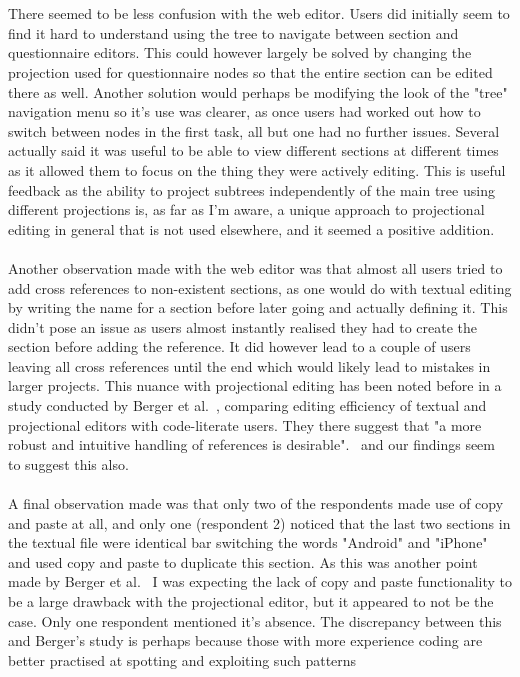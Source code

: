\documentclass{article}
\begin{document}
{\\
\\
There seemed to be less confusion with the web editor. Users did initially seem to find it hard to understand using the tree to navigate between section and questionnaire editors. This could however largely be solved by changing the projection used for questionnaire nodes so that the entire section can be edited there as well. Another solution would perhaps be modifying the look of the "tree" navigation menu so it's use was clearer, as once users had worked out how to switch between nodes in the first task, all but one had no further issues. Several actually said it was useful to be able to view different sections at different times as it allowed them to focus on the thing they were actively editing. This is useful feedback as the ability to project subtrees independently of the main tree using different projections is, as far as I'm aware, a unique approach to projectional editing in general that is not used elsewhere, and it seemed a positive addition.
\\
\\
Another observation made with the web editor was that almost all users tried to add cross references to non-existent sections, as one would do with textual editing by writing the name for a section before later going and actually defining it. This didn't pose an issue as users almost instantly realised they had to create the section before adding the reference. It did however lead to a couple of users leaving all cross references until the end which would likely lead to mistakes in larger projects. This nuance with projectional editing has been noted before in a study conducted by Berger et al.~\cite{projEditControlledExperiment}, comparing editing efficiency of textual and projectional editors with code-literate users. They there suggest that "a more robust and intuitive handling of references is desirable".~\cite[pg. 9]{projEditControlledExperiment} and our findings seem to suggest this also.
\\
\\
A final observation made was that only two of the respondents made use of copy and paste at all, and only one (respondent 2) noticed that the last two sections in the textual file were identical bar switching the words "Android" and "iPhone" and used copy and paste to duplicate this section. As this was another point made by Berger et al.~\cite{projEditControlledExperiment} I was expecting the lack of copy and paste functionality to be a large drawback with the projectional editor, but it appeared to not be the case. Only one respondent mentioned it's absence. The discrepancy between this and Berger's study is perhaps because those with more experience coding are better practised at spotting and exploiting such patterns 

}
\end{document}
